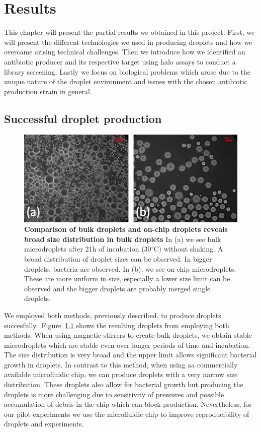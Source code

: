 \chapter{Results}

This chapter will present the partial results we obtained in this project. First, we will present the different technologies we used in producing droplets and how we overcame arising technical challenges. Then we introduce how we identified an antibiotic producer and its respective target using halo assays to conduct a library screening. Lastly we focus on biological problems which arose due to the unique nature of the droplet environment and issues with the chosen antibiotic production strain in general. 

\section{Successful droplet production}
\begin{figure}
\centering
\includegraphics[width=\linewidth]{graphics/2025_09_30_droplets_fig5.png}
\caption{\textbf{Comparison of bulk droplets and on-chip droplets reveals broad size distribution in bulk droplets} In (a) we see bulk microdroplets after 21h of incubation (30$^\circ$C) without shaking. A broad distribution of droplet sizes can be observed. In bigger droplets, bacteria are observed. In (b), we see on-chip microdroplets. These are more uniform in size, especially a lower size limit can be observed and the bigger droplets are probably merged single droplets.}
\label{fig:results_droplet_bulk_vs_chip}
\end{figure}
We employed both methods, previously described, to produce droplets succesfully.~Figure~\ref{fig:results_droplet_bulk_vs_chip} shows the resulting droplets from employing both methods. When using magnetic stirrers to create bulk droplets, we obtain stable microdroplets which are stable even over longer periods of time and incubation. The size distribution is very broad and the upper limit allows significant bacterial growth in droplets. In contrast to this method, when using aa commercially available microfluidic chip, we can produce droplets with a very narrow size distribution. These droplets also allow for bacterial growth but producing the droplets is more challenging due to sensitivity of pressures and possible accumulation of debris in the chip which can block production. Nevertheless, for our pilot experiments we use the microfluidic chip to improve reproducibility of droplets and experiments.

